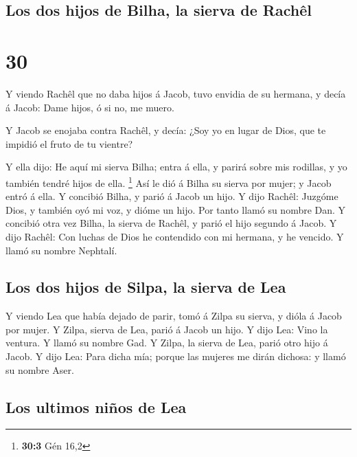 \hypertarget{los-dos-hijos-de-bilha-la-sierva-de-rachuxeal}{%
\subsection{Los dos hijos de Bilha, la sierva de
Rachêl}\label{los-dos-hijos-de-bilha-la-sierva-de-rachuxeal}}

\hypertarget{section-29}{%
\section{30}\label{section-29}}

 Y viendo Rachêl que no daba hijos á Jacob, tuvo envidia de
su hermana, y decía á Jacob: Dame hijos, ó si no, me muero.

 Y Jacob se enojaba contra Rachêl, y decía: ¿Soy yo en lugar
de Dios, que te impidió el fruto de tu vientre?

 Y ella dijo: He aquí mi sierva Bilha; entra á ella, y
parirá sobre mis rodillas, y yo también tendré hijos de ella.
\footnote{\textbf{30:3} Gén 16,2}  Así le dió á Bilha su
sierva por mujer; y Jacob entró á ella.  Y concibió Bilha, y
parió á Jacob un hijo.  Y dijo Rachêl: Juzgóme Dios, y
también oyó mi voz, y dióme un hijo. Por tanto llamó su nombre Dan.
 Y concibió otra vez Bilha, la sierva de Rachêl, y parió el
hijo segundo á Jacob.  Y dijo Rachêl: Con luchas de Dios he
contendido con mi hermana, y he vencido. Y llamó su nombre Nephtalí.

\hypertarget{los-dos-hijos-de-silpa-la-sierva-de-lea}{%
\subsection{Los dos hijos de Silpa, la sierva de
Lea}\label{los-dos-hijos-de-silpa-la-sierva-de-lea}}

 Y viendo Lea que había dejado de parir, tomó á Zilpa su
sierva, y dióla á Jacob por mujer.  Y Zilpa, sierva de Lea,
parió á Jacob un hijo.  Y dijo Lea: Vino la ventura. Y
llamó su nombre Gad.  Y Zilpa, la sierva de Lea, parió otro
hijo á Jacob.  Y dijo Lea: Para dicha mía; porque las
mujeres me dirán dichosa: y llamó su nombre Aser.

\hypertarget{los-ultimos-niuxf1os-de-lea}{%
\subsection{Los ultimos niños de
Lea}\label{los-ultimos-niuxf1os-de-lea}}

